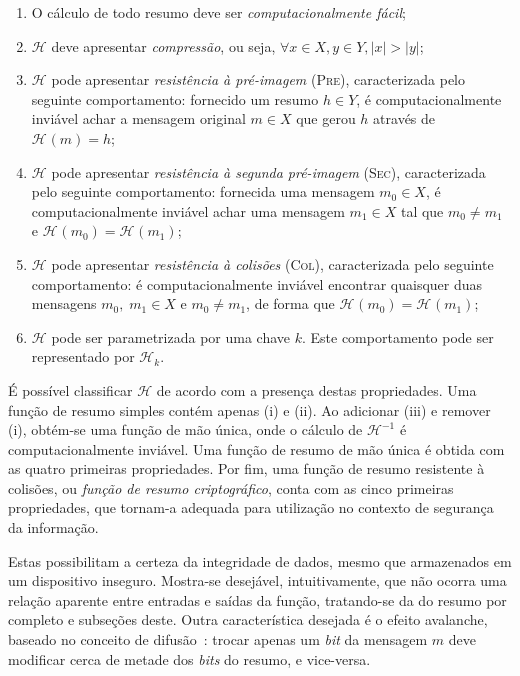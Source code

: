 \documentclass[12pt]{report}
\newcommand{\hh}{$\mathcal{H}$}
\newcommand{\hash}[2][]{\mathcal{H}^{#1}(#2)}
\newcommand{\length}[1]{\vert #1 \vert}
\begin{document}
\begin{enumerate}[label=(\roman*)]

    \item O cálculo de todo resumo deve ser \emph{computacionalmente fácil};
    
    \item \hh{} deve apresentar \emph{compressão},
        ou seja, $\forall x \in X, y \in Y, \length{x} > \length{y}$;
    
    \item \hh{} pode apresentar \emph{resistência à pré-imagem} (\textsc{Pre}),
        caracterizada pelo seguinte comportamento: fornecido um resumo
        $h \in Y$, é computacionalmente inviável achar a mensagem
        original $m \in X$ que gerou $h$ através de $\hash{m} = h$;

    \item \hh{} pode apresentar \emph{resistência à segunda pré-imagem}
        (\textsc{Sec}), caracterizada pelo seguinte comportamento:
        fornecida uma mensagem $m_0 \in X$, é computacionalmente
        inviável achar uma mensagem $m_1 \in X$ tal que $m_0 \neq m_1$ e
        $\hash{m_0} = \hash{m_1}$;
        
    \item \hh{} pode apresentar \emph{resistência à colisões}
        (\textsc{Col}), caracterizada pelo seguinte comportamento:
        é computacionalmente inviável encontrar quaisquer duas
        mensagens $m_0, \; m_1 \in X$ e $m_0 \neq m_1$, de forma
        que $\hash{m_0} = \hash{m_1}$;
        
    \item \hh{} pode ser parametrizada por uma chave $k$.
        Este comportamento pode ser representado por $\mathcal{H}_k$.
        
\end{enumerate}

É possível classificar \hh{} de acordo com a presença destas
propriedades. Uma função de resumo simples contém apenas (i) e (ii). Ao
adicionar (iii) e remover (i), obtém-se uma função de mão única, onde o cálculo de
$\mathcal{H}^{-1}$ é computacionalmente inviável. Uma função de resumo
de mão única é obtida com as quatro primeiras propriedades. Por fim, uma
função de resumo resistente à colisões, ou \emph{função de resumo
criptográfico}, conta com as cinco primeiras propriedades, que
tornam-a adequada para utilização no contexto de segurança da informação. 

Estas possibilitam a certeza da integridade de dados, mesmo que armazenados
em um dispositivo inseguro. Mostra-se desejável, intuitivamente, que não ocorra
uma relação aparente entre entradas e saídas da função, tratando-se da
do resumo por completo e subseções deste.  Outra característica desejada é o
efeito avalanche, baseado no conceito de difusão~\cite{Stallings:2010:CNS:1824151}:
trocar apenas um \emph{bit} da mensagem $m$ deve modificar cerca de metade
dos \emph{bits} do resumo, e vice-versa.
\end{document}
